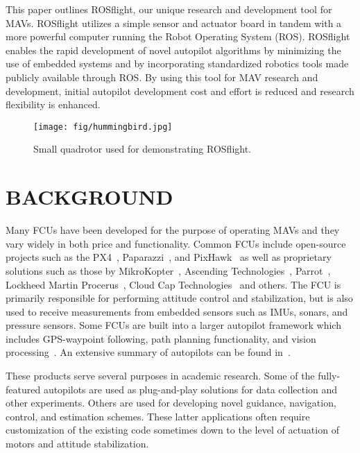 \documentclass[letterpaper, 10 pt, conference]{ieeeconf}  %
\begin{document}
This paper outlines ROSflight, our unique research and development tool for MAVs. ROSflight utilizes a simple sensor and actuator board in tandem with a more powerful computer running the Robot Operating System (ROS). ROSflight enables the rapid development of novel autopilot algorithms by minimizing the use of embedded systems and by incorporating standardized robotics tools made publicly available through ROS.  By using this tool for MAV research and development, initial autopilot development cost and effort is reduced and research flexibility is enhanced.

\begin{figure}
	\texttt{[image: fig/hummingbird.jpg]}
	\caption{Small quadrotor used for demonstrating ROSflight.}
		\label{fig:hummingbird}
\end{figure}

\section{BACKGROUND}

Many FCUs have been developed for the purpose of operating MAVs and they vary widely in both price and functionality. Common FCUs include open-source projects such as the PX4~\cite{Meier2015}, Paparazzi~\cite{Gati2013}, and PixHawk~\cite{1_ardupilot.com_2016} as well as proprietary solutions such as those by MikroKopter~\cite{4_gmbh_2016}, Ascending Technologies~\cite{2_ascending_technologies_gmbh_2016}, Parrot~\cite{3_parrot.com_2016}, Lockheed Martin Procerus~\cite{kestrel.com_2016}, Cloud Cap Technologies~\cite{piccolo.com_2016} and others.  The FCU is primarily responsible for performing attitude control and stabilization, but is also used to receive measurements from embedded sensors such as IMUs, sonars, and pressure sensors. Some FCUs are built into a larger autopilot framework which includes GPS-waypoint following, path planning functionality, and vision processing~\cite{Meier2011}.  An extensive summary of autopilots can be found in~\cite{Chao2010}.

These products serve several purposes in academic research.  Some of the fully-featured autopilots are used as plug-and-play solutions for data collection and other experiments.  Others are used for developing novel guidance, navigation, control, and estimation schemes.  These latter applications often require customization of the existing code sometimes down to the level of actuation of motors and attitude stabilization.
\end{document}
